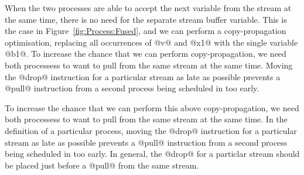 When the two processes are able to accept the next variable from the stream at the same time, there is no need for the separate stream buffer variable. This is the case in Figure~\ref{fig:Process:Fused}, and we can perform a copy-propagation optimisation, replacing all occurrences of @v@ and @x1@ with the single variable @b1@. To increase the chance that we can perform copy-propagation, we need both processess to want to pull from the same stream at the same time. Moving the @drop@ instruction for a particular stream as late as possible prevents a @pull@ instruction from a second process being scheduled in too early.

To increase the chance that we can perform this above copy-propagation, we need both processess to want to pull from the same stream at the same time. In the definition of a particular process, moving the @drop@ instruction for a particular stream as late as possible prevents a @pull@ instruction from a second process being scheduled in too early. In general, the @drop@ for a particlar stream should be placed just before a @pull@ from the same stream. 




